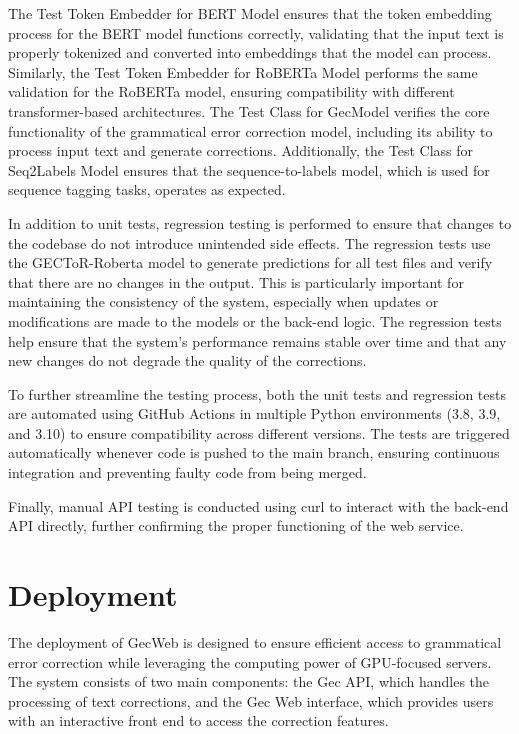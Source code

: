The Test Token Embedder for BERT Model ensures that the token embedding process for the BERT model functions correctly, validating that the input text is properly tokenized and converted into embeddings that the model can process.
Similarly, the Test Token Embedder for RoBERTa Model performs the same validation for the RoBERTa model, ensuring compatibility with different transformer-based architectures.
The Test Class for GecModel verifies the core functionality of the grammatical error correction model, including its ability to process input text and generate corrections.
Additionally, the Test Class for Seq2Labels Model ensures that the sequence-to-labels model, which is used for sequence tagging tasks, operates as expected.

In addition to unit tests, regression testing is performed to ensure that changes to the codebase do not introduce unintended side effects.
The regression tests use the GECToR-Roberta model to generate predictions for all test files and verify that there are no changes in the output.
This is particularly important for maintaining the consistency of the system, especially when updates or modifications are made to the models or the back-end logic.
The regression tests help ensure that the system's performance remains stable over time and that any new changes do not degrade the quality of the corrections.

To further streamline the testing process, both the unit tests and regression tests are automated using GitHub Actions in multiple Python environments (3.8, 3.9, and 3.10) to ensure compatibility across different versions.
The tests are triggered automatically whenever code is pushed to the main branch, ensuring continuous integration and preventing faulty code from being merged.

Finally, manual API testing is conducted using curl to interact with the back-end API directly, further confirming the proper functioning of the web service.

\section{Deployment}

The deployment of GecWeb is designed to ensure efficient access to grammatical error correction while leveraging the computing power of GPU-focused servers.
The system consists of two main components: the Gec API, which handles the processing of text corrections, and the Gec Web interface, which provides users with an interactive front end to access the correction features.

